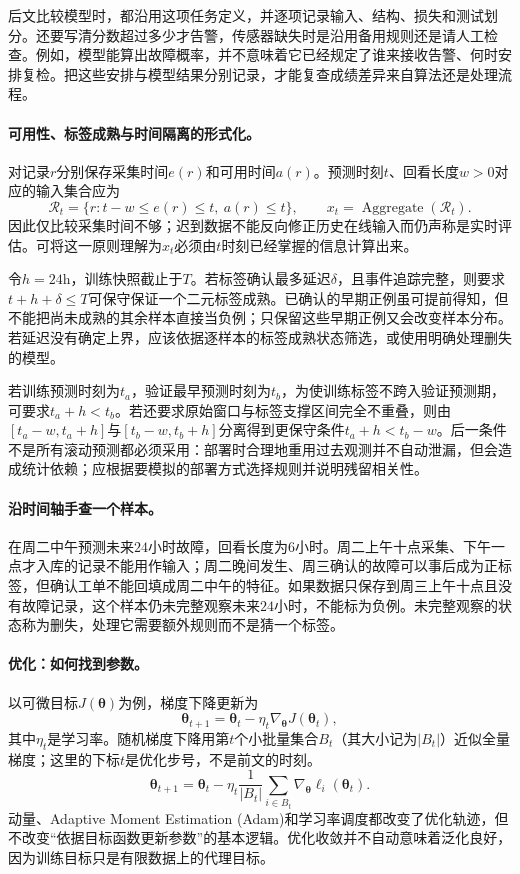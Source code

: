 后文比较模型时，都沿用这项任务定义，并逐项记录输入、结构、损失和测试划分。还要写清分数超过多少才告警，传感器缺失时是沿用备用规则还是请人工检查。例如，模型能算出故障概率，并不意味着它已经规定了谁来接收告警、何时安排复检。把这些安排与模型结果分别记录，才能复查成绩差异来自算法还是处理流程。

\paragraph{可用性、标签成熟与时间隔离的形式化。}
对记录$r$分别保存采集时间$e(r)$和可用时间$a(r)$。预测时刻$t$、回看长度$w>0$对应的输入集合应为
\begin{equation}
 \mathcal R_t=\{r:t-w\leq e(r)\leq t,\ a(r)\leq t\},\qquad
 x_t=\operatorname{Aggregate}(\mathcal R_t).
\end{equation}
因此仅比较采集时间不够；迟到数据不能反向修正历史在线输入而仍声称是实时评估。可将这一原则理解为$x_t$必须由$t$时刻已经掌握的信息计算出来。

令$h=24\mathrm h$，训练快照截止于$T$。若标签确认最多延迟$\delta$，且事件追踪完整，则要求$t+h+\delta\leq T$可保守保证一个二元标签成熟。已确认的早期正例虽可提前得知，但不能把尚未成熟的其余样本直接当负例；只保留这些早期正例又会改变样本分布。若延迟没有确定上界，应该依据逐样本的标签成熟状态筛选，或使用明确处理删失的模型。

若训练预测时刻为$t_a$，验证最早预测时刻为$t_b$，为使训练标签不跨入验证预测期，可要求$t_a+h<t_b$。若还要求原始窗口与标签支撑区间完全不重叠，则由$[t_a-w,t_a+h]$与$[t_b-w,t_b+h]$分离得到更保守条件$t_a+h<t_b-w$。后一条件不是所有滚动预测都必须采用：部署时合理地重用过去观测并不自动泄漏，但会造成统计依赖；应根据要模拟的部署方式选择规则并说明残留相关性。

\paragraph{沿时间轴手查一个样本。}
在周二中午预测未来$24$小时故障，回看长度为$6$小时。周二上午十点采集、下午一点才入库的记录不能用作输入；周二晚间发生、周三确认的故障可以事后成为正标签，但确认工单不能回填成周二中午的特征。如果数据只保存到周三上午十点且没有故障记录，这个样本仍未完整观察未来$24$小时，不能标为负例。未完整观察的状态称为删失，处理它需要额外规则而不是猜一个标签。

\paragraph{优化：如何找到参数。}
以可微目标$J(\bm{\theta})$为例，梯度下降更新为
\begin{equation}
 \bm{\theta}_{t+1}=\bm{\theta}_t-\eta_t\nabla_{\bm{\theta}}J(\bm{\theta}_t),
\end{equation}
其中$\eta_t$是学习率。随机梯度下降用第$t$个小批量集合$B_t$（其大小记为$|B_t|$）近似全量梯度；这里的下标$t$是优化步号，不是前文的时刻。
\begin{equation}
 \bm{\theta}_{t+1}=\bm{\theta}_t-\eta_t\frac{1}{|B_t|}\sum_{i\in B_t}\nabla_{\bm{\theta}}\ell_i(\bm{\theta}_t).
\end{equation}
动量、Adaptive Moment Estimation (Adam)和学习率调度都改变了优化轨迹，但不改变“依据目标函数更新参数”的基本逻辑。优化收敛并不自动意味着泛化良好，因为训练目标只是有限数据上的代理目标。

